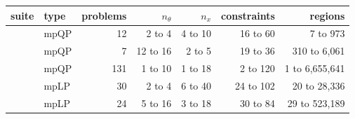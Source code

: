 \begin{tabular}{@{}L{4.6cm} l r r r r r@{}}
\toprule
suite & type & problems & $n_\theta$ & $n_x$ & constraints & regions \\
\midrule
{} & mpQP & 12 & 2 to 4 & 4 to 10 & 16 to 60 & 7 to 973 \\
 & mpQP & 7 & 12 to 16 & 2 to 5 & 19 to 36 & 310 to 6,061 \\
 & mpQP & 131 & 1 to 10 & 1 to 18 & 2 to 120 & 1 to 6,655,641 \\
 & mpLP & 30 & 2 to 4 & 6 to 40 & 24 to 102 & 20 to 28,336 \\
 & mpLP & 24 & 5 to 16 & 3 to 18 & 30 to 84 & 29 to 523,189 \\
\bottomrule
\end{tabular}
